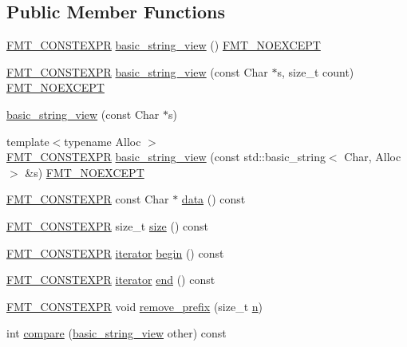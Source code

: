 \subsection*{Public Member Functions}
\begin{DoxyCompactItemize}
\item 
\hyperlink{core_8h_a69201cb276383873487bf68b4ef8b4cd}{F\+M\+T\+\_\+\+C\+O\+N\+S\+T\+E\+X\+PR} \hyperlink{classbasic__string__view_a3285fa5f62f1de2776c6a3fcc33cfe0a}{basic\+\_\+string\+\_\+view} () \hyperlink{core_8h_aef128913e8400683b1cbd1a3a2e11df3}{F\+M\+T\+\_\+\+N\+O\+E\+X\+C\+E\+PT}
\item 
\hyperlink{core_8h_a69201cb276383873487bf68b4ef8b4cd}{F\+M\+T\+\_\+\+C\+O\+N\+S\+T\+E\+X\+PR} \hyperlink{classbasic__string__view_a30be409cd941f8fa06e5e7b27496e3dc}{basic\+\_\+string\+\_\+view} (const Char $\ast$s, size\+\_\+t count) \hyperlink{core_8h_aef128913e8400683b1cbd1a3a2e11df3}{F\+M\+T\+\_\+\+N\+O\+E\+X\+C\+E\+PT}
\item 
\hyperlink{classbasic__string__view_a84823e4cf3eadc6bbe4ecd18e7685ffd}{basic\+\_\+string\+\_\+view} (const Char $\ast$s)
\item 
{\footnotesize template$<$typename Alloc $>$ }\\\hyperlink{core_8h_a69201cb276383873487bf68b4ef8b4cd}{F\+M\+T\+\_\+\+C\+O\+N\+S\+T\+E\+X\+PR} \hyperlink{classbasic__string__view_a26380481d5c1675f0f56333f764c496b}{basic\+\_\+string\+\_\+view} (const std\+::basic\+\_\+string$<$ Char, Alloc $>$ \&s) \hyperlink{core_8h_aef128913e8400683b1cbd1a3a2e11df3}{F\+M\+T\+\_\+\+N\+O\+E\+X\+C\+E\+PT}
\item 
\hyperlink{core_8h_a69201cb276383873487bf68b4ef8b4cd}{F\+M\+T\+\_\+\+C\+O\+N\+S\+T\+E\+X\+PR} const Char $\ast$ \hyperlink{classbasic__string__view_a48c221f626c53e68f6d63105329f6b08}{data} () const
\item 
\hyperlink{core_8h_a69201cb276383873487bf68b4ef8b4cd}{F\+M\+T\+\_\+\+C\+O\+N\+S\+T\+E\+X\+PR} size\+\_\+t \hyperlink{classbasic__string__view_a7fd9f4dcac1782259b0cd217af69d737}{size} () const
\item 
\hyperlink{core_8h_a69201cb276383873487bf68b4ef8b4cd}{F\+M\+T\+\_\+\+C\+O\+N\+S\+T\+E\+X\+PR} \hyperlink{classbasic__string__view_aac52df0e56cb4b197372306e0da039e0}{iterator} \hyperlink{classbasic__string__view_a3433da1f079eb7874d97f32245bb08fa}{begin} () const
\item 
\hyperlink{core_8h_a69201cb276383873487bf68b4ef8b4cd}{F\+M\+T\+\_\+\+C\+O\+N\+S\+T\+E\+X\+PR} \hyperlink{classbasic__string__view_aac52df0e56cb4b197372306e0da039e0}{iterator} \hyperlink{classbasic__string__view_a7d262051736a662df0f35d6e39ebf773}{end} () const
\item 
\hyperlink{core_8h_a69201cb276383873487bf68b4ef8b4cd}{F\+M\+T\+\_\+\+C\+O\+N\+S\+T\+E\+X\+PR} void \hyperlink{classbasic__string__view_a1da7aa04f8f729b4f846e573cecba499}{remove\+\_\+prefix} (size\+\_\+t \hyperlink{format_8h_a9ab7e5832cef391eb8b1505a601fb215}{n})
\item 
int \hyperlink{classbasic__string__view_af3f5cdfe71a7ada3227d5702ea456128}{compare} (\hyperlink{classbasic__string__view}{basic\+\_\+string\+\_\+view} other) const
\end{DoxyCompactItemize}
